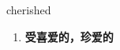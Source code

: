 
\begin{frame}
{\huge cherished}
\begin{center}
\begin{enumerate}\Large
  \item \textbf{受喜爱的，珍爱的}
\end{enumerate}
\end{center}
\end{frame}
